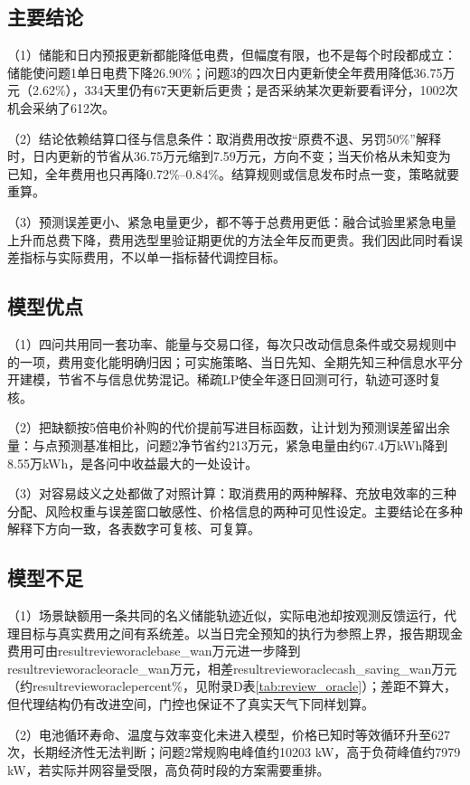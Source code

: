 \documentclass[UTF8,fontset=none,a4paper,zihao=-4]{ctexart}
\newcommand{\rv}[2]{\csname result#1#2\endcsname}
\begin{document}
\subsection{主要结论}
（1）储能和日内预报更新都能降低电费，但幅度有限，也不是每个时段都成立：储能使问题1单日电费下降26.90\%；问题3的四次日内更新使全年费用降低36.75万元（2.62\%），334天里仍有67天更新后更贵；是否采纳某次更新要看评分，1002次机会采纳了612次。

（2）结论依赖结算口径与信息条件：取消费用改按“原费不退、另罚50\%”解释时，日内更新的节省从36.75万元缩到7.59万元，方向不变；当天价格从未知变为已知，全年费用也只再降0.72\%--0.84\%。结算规则或信息发布时点一变，策略就要重算。

（3）预测误差更小、紧急电量更少，都不等于总费用更低：融合试验里紧急电量上升而总费下降，费用选型里验证期更优的方法全年反而更贵。我们因此同时看误差指标与实际费用，不以单一指标替代调控目标。

\subsection{模型优点}
（1）四问共用同一套功率、能量与交易口径，每次只改动信息条件或交易规则中的一项，费用变化能明确归因；可实施策略、当日先知、全期先知三种信息水平分开建模，节省不与信息优势混记。稀疏LP使全年逐日回测可行，轨迹可逐时复核。

（2）把缺额按5倍电价补购的代价提前写进目标函数，让计划为预测误差留出余量：与点预测基准相比，问题2净节省约213万元，紧急电量由约67.4万kWh降到8.55万kWh，是各问中收益最大的一处设计。

（3）对容易歧义之处都做了对照计算：取消费用的两种解释、充放电效率的三种分配、风险权重与误差窗口敏感性、价格信息的两种可见性设定。主要结论在多种解释下方向一致，各表数字可复核、可复算。

\subsection{模型不足}
（1）场景缺额用一条共同的名义储能轨迹近似，实际电池却按观测反馈运行，代理目标与真实费用之间有系统差。以当日完全预知的执行为参照上界，报告期现金费用可由\rv{review}{oraclebase_wan}万元进一步降到\rv{review}{oracleoracle_wan}万元，相差\rv{review}{oraclecash_saving_wan}万元（约\rv{review}{oraclepercent}\%，见附录D表\ref{tab:review_oracle}）；差距不算大，但代理结构仍有改进空间，门控也保证不了真实天气下同样划算。

（2）电池循环寿命、温度与效率变化未进入模型，价格已知时等效循环升至627次，长期经济性无法判断；问题2常规购电峰值约10203 kW，高于负荷峰值约7979 kW，若实际并网容量受限，高负荷时段的方案需要重排。
\end{document}
